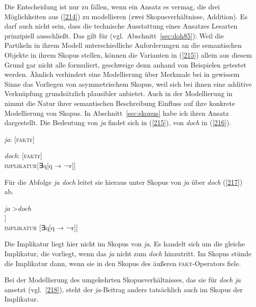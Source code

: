 Die Entscheidung ist nur zu fällen, wenn ein Ansatz es vermag, die drei Möglichkeiten aus (\ref{214}) zu modellieren (zwei Skopusverhältnisse, Addition). Es darf auch nicht sein, dass die technische Ausstattung eines Ansatzes Lesarten prinzipiell ausschließt. Das gilt für \citet{Doherty1985} (vgl.\ Abschnitt~\ref{sec:doh85}): Weil die Partikeln in ihrem Modell unterschiedliche Anforderungen an die semantischen Objekte in ihrem Skopus stellen, können die Varianten in (\ref{215}) allein aus diesem Grund gar nicht alle formuliert, geschweige denn anhand von Beispielen getestet werden. Ähnlich verhindert eine Modellierung über Merkmale bei \citet{Thurmair1989, Thurmair1991} in gewissem Sinne das Vorliegen von asymmetrischem Skopus, weil sich bei ihnen eine additive Verknüpfung grundsätzlich plausibler anbietet. Auch in der Modellierung in \citet{Ormelius-Sandblom1997} nimmt die Natur ihrer semantischen Beschreibung Einfluss auf ihre konkrete Modellierung von Skopus. In Abschnitt~\ref{sec:skopus} habe ich ihren Ansatz dargestellt. Die Bedeutung von \textit{ja} findet sich in (\ref{215}), von \textit{doch} in (\ref{216}).\largerpage

\begin{exe} 
	\ex\label{215} 
			\textit{ja}: [\textsc{fakt}r]
\end{exe}
\begin{exe}
	\ex\label{216} 
		\textit{doch}: [\textsc{fakt}r]\\
		\textsc{implikatur}[∃\textrm{q}[\textrm{q} → ¬\textrm{r}]]
\end{exe}
Für die Abfolge \textit{ja doch} leitet sie hieraus unter Skopus von \textit{ja} über \textit{doch} (\ref{217}) ab.

\begin{exe}
	\ex\label{217}
		\textit{ja} \textgreater\xspace\textit{doch}\\\relax										
		[\textrm{\textsc{fakt}}[\textrm{\textsc{fakt}r}]]\\\relax
		\textsc{implikatur} [∃\textrm{q}[\textrm{q} → ¬\textrm{r}]]
\end{exe}
Die Implikatur liegt hier nicht im Skopus von \textit{ja}. Es handelt sich um die gleiche Implikatur, die vorliegt, wenn das \textit{ja} nicht zum \textit{doch} hinzutritt. Im Skopus stünde die Implikatur dann, wenn sie in den Skopus des äußeren \textsc{fakt}-Operators fiele.

Bei der Modellierung des umgekehrten Skopusverhältnisses, das sie für \textit{doch ja} ansetzt (vgl.\ \ref{218}), steht der \textit{ja}-Beitrag anders tatsächlich auch im Skopus der Implikatur.

